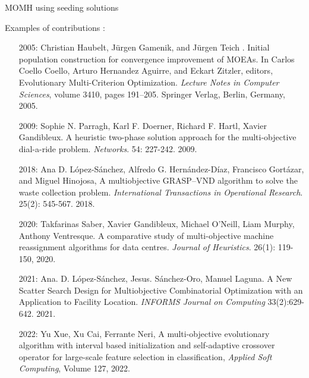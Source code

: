 \documentclass[10pt,xcolor=dvipsnames]{beamer}
\begin{document}
\begin{frame}{MOMH using seeding solutions}


Examples of contributions :

{\scriptsize
\begin{itemize}

\item[2005:]     Christian Haubelt, Jürgen Gamenik, and Jürgen Teich . Initial population construction for convergence improvement of MOEAs. In Carlos Coello Coello, Arturo Hernandez Aguirre, and Eckart Zitzler, editors, Evolutionary Multi-Criterion Optimization. \textit{Lecture Notes in Computer Sciences}, volume 3410, pages 191–205. Springer Verlag, Berlin, Germany, 2005.\vspace{1mm}\\

\item[2009:] Sophie N. Parragh, Karl F. Doerner, Richard F. Hartl, Xavier Gandibleux.
A heuristic two-phase solution approach for the multi-objective dial-a-ride problem.
\textit{Networks}. 54: 227-242. 2009.\vspace{1mm}\\

\item[2018:]
Ana D. López-Sánchez, Alfredo G. Hernández-Díaz, Francisco Gortázar, and Miguel Hinojosa, 
A multiobjective GRASP–VND algorithm to solve the waste collection problem. \textit{International Transactions in Operational Research}. 25(2): 545-567. 2018.\vspace{1mm}\\

\item[2020:]
Takfarinas Saber, Xavier Gandibleux, Michael O'Neill, Liam Murphy, Anthony Ventresque.
A comparative study of multi-objective machine reassignment algorithms for data centres. 
\textit{Journal of Heuristics}. 26(1): 119-150, 2020.\vspace{1mm}\\

\item[2021:]
Ana. D. López-Sánchez, Jesus. Sánchez-Oro, Manuel Laguna. A New Scatter Search Design for Multiobjective Combinatorial Optimization with an Application to Facility Location. \textit{INFORMS Journal on Computing} 33(2):629-642. 2021.\vspace{1mm}\\

\item[2022:]
Yu Xue, Xu Cai, Ferrante Neri,
A multi-objective evolutionary algorithm with interval based initialization and self-adaptive crossover operator for large-scale feature selection in classification,
\textit{Applied Soft Computing}, Volume 127, 2022.\vspace{1mm}\\

\end{itemize}
}

\end{frame}
\end{document}

